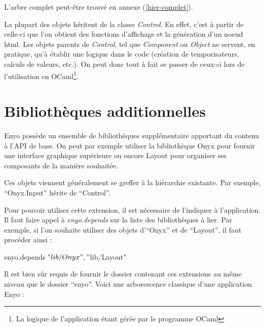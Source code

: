 \documentclass[11pt,a4paper]{report}
\begin{document}
L'arbre complet peut-être trouvé en annexe (\ref{hier-complet}).

La plupart des objets héritent de la classe \emph{Control}. En effet, c'est à partir de celle-ci
que l'on obtient des fonctions d'affichage et la génération d'un noeud html.
Les objets parents de \emph{Control}, tel que \emph{Component} ou \emph{Object} ne servent, en pratique,
qu'à établir une logique dans le code (création de temporisateurs, calculs de valeurs, etc.).
On peut donc tout à fait se passer de ceux-ci lors de l'utilisation en OCaml\footnote{La logique de
l'application étant gérée par le programme OCaml}.

\section{Bibliothèques additionnelles}

Enyo possède un ensemble de bibliothèques supplémentaire apportant du contenu à l'API de base.
On peut par exemple utiliser la bibliothèque Onyx pour fournir une interface graphique 
supérieure ou encore Layout pour organiser ses composants de la manière souhaitée.

Ces objets viennent généralement se greffer à la hiérarchie existante. Par exemple,
``Onyx.Input'' hérite de ``Control''.

Pour pouvoir utiliser cette extension, il est nécessaire de l'indiquer à l'application.
Il faut faire appel à \emph{enyo.depends} sur la liste des bibliothèques à lier.
Par exemple, si l'on souhaite utiliser des objets d'``Onyx'' et de ``Layout'', il faut procéder ainsi :

\begin{JavaScript}
  enyo.depends{ "$lib/Onyx", "$lib/Layout"}
\end{JavaScript}

Il est bien sûr requis de fournir le dossier contenant ces extensions au même niveau que le dossier
``enyo''. Voici une arborescence classique d'une application Enyo :

\end{document}
